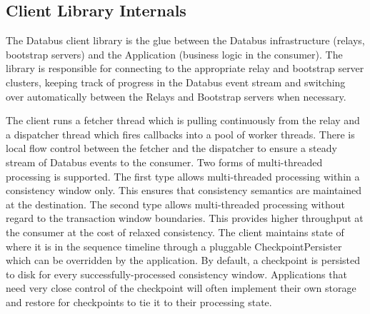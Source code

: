 \subsection{Client Library Internals}
The Databus client library is the glue between the Databus infrastructure (relays, bootstrap servers) 
and the Application (business logic in the consumer). 
The library is responsible for connecting to the appropriate relay and bootstrap server clusters, keeping track of progress in the Databus event stream and switching over automatically between the Relays and Bootstrap servers when necessary. 

The client runs a fetcher thread which is pulling continuously from the relay and a dispatcher thread which fires callbacks into a pool of worker threads. There is local flow control between the fetcher and the dispatcher to ensure a steady stream of Databus events to the consumer. Two forms of multi-threaded processing is supported. The first type allows multi-threaded processing within a consistency window only. This ensures that consistency semantics are maintained at the destination. The second type allows multi-threaded processing without regard to the transaction window boundaries. This provides higher throughput at the consumer at the cost of relaxed consistency. 
The client maintains state of where it is in the sequence timeline through a pluggable CheckpointPersister which can be overridden by the application. By default, a checkpoint is persisted to disk for every successfully-processed consistency window. Applications that need very close control of the checkpoint will often implement their own storage and restore for checkpoints to tie it to their processing state. 
